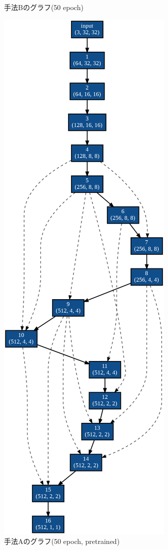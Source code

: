 \documentclass[twocolumn]{jarticle}     %
\begin{document}
\begin{figure}[tb]
\begin{minipage}{0.333\hsize}
\begin{center}
 		\caption{手法Bのグラフ(50 epoch)}
 		\label{fig:graph_e}
 	\end{center}
 \end{minipage}
 \begin{minipage}{0.333\hsize}
 	\begin{center}
 		\includegraphics[clip,scale=0.25]{graph_50_pretrain_search.png}
 		\caption{手法Aのグラフ(50 epoch, pretrained)}
 		\label{fig:graph_p}
 	\end{center}
 \end{minipage}
\end{figure}
\end{document}

